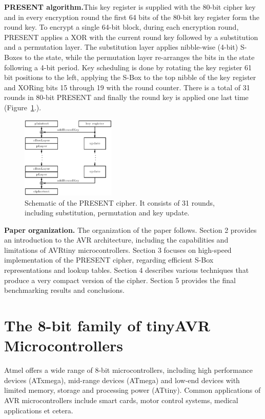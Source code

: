 \documentclass[11pt]{article}
\begin{document}
\textbf{PRESENT algorithm.}This key register is supplied with the 80-bit cipher key and in every encryption round the first 64 bits of the 80-bit key register form the round key.
To encrypt a single 64-bit block, during each encryption round, PRESENT applies a XOR with the current round key followed by a substitution and a permutation layer.
The substitution layer applies nibble-wise (4-bit) S-Boxes to the state, while the permutation layer re-arranges the bits in the state following a 4-bit period.
Key scheduling is done by rotating the key register 61 bit positions to the left, applying the S-Box to the top nibble of the key register and XORing bits 15 through 19 with the round counter.
There is a total of 31 rounds in 80-bit PRESENT and finally the round key is applied one last time 
(Figure~\ref{present_schematic}.).


\begin{figure}[h]
	\label{present_schematic}
	\centering
	 \includegraphics [width=0.4\textwidth]{present.eps}
\caption{\footnotesize Schematic of the PRESENT cipher. It consists of 31 rounds, including substitution, permutation and key update.}
\end{figure}

\textbf{Paper organization.} The organization of the paper follows. Section 2 provides an introduction to the AVR architecture, including the capabilities and limitations of AVRtiny microcontrollers. Section 3 focuses on high-speed implementation of the PRESENT cipher, regarding efficient S-Box representations and lookup tables. Section 4 describes various techniques that produce a very compact version of the cipher. Section 5 provides the final benchmarking results and conclusions.

\section{The 8-bit family of tinyAVR Microcontrollers}
Atmel offers a wide range of 8-bit microcontrollers, including high performance devices (ATxmega), mid-range devices (ATmega) and low-end devices with limited memory, storage and processing power (ATtiny). Common applications of AVR microcontrollers include smart cards, motor control systems, medical applications et cetera. 
\end{document}
